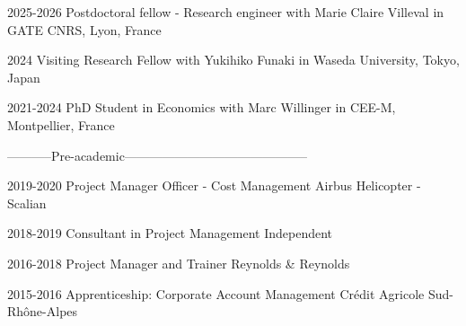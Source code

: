 

\begin{cvskills}

  \cvskill
    {2025-2026} %
    {Postdoctoral fellow - Research engineer} %
    { with Marie Claire Villeval in GATE CNRS, Lyon, France} %

  \cvskill
    {2024} %
    {Visiting Research Fellow} %
    { with Yukihiko Funaki in Waseda University, Tokyo, Japan} %

  \cvskill
    {2021-2024} %
    {PhD Student in Economics} %
    { with Marc Willinger in CEE-M, Montpellier, France} %

  \cvskill
    {} %
    {} %
    {-----------Pre-academic--------------------------------------------} %

  \cvskill
    {2019-2020} %
    {Project Manager Officer - Cost Management} %
    {Airbus Helicopter - Scalian} %
    
  \cvskill
    {2018-2019} %
    {Consultant in Project Management} %
    {Independent} %

  \cvskill
    {2016-2018} %
    {Project Manager and Trainer} %
    {Reynolds \& Reynolds} %

  \cvskill
    {2015-2016} %
    {Apprenticeship: Corporate Account Management} %
    {Crédit Agricole Sud-Rhône-Alpes} %


\end{cvskills}
